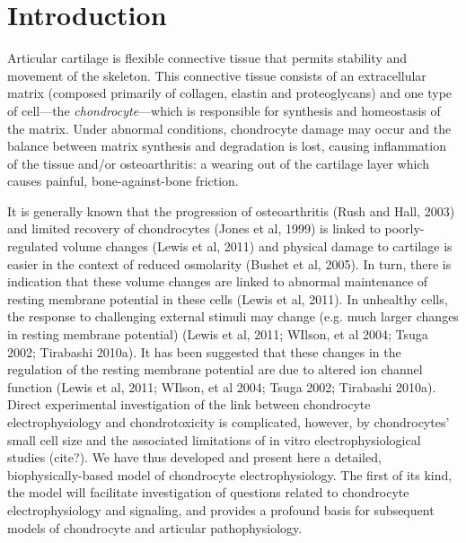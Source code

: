 \section{Introduction}
\label{introduction}

Articular cartilage is flexible connective tissue that permits stability and movement of the skeleton. 
This connective tissue consists of an extracellular matrix (composed primarily of collagen, elastin and proteoglycans) and one type of cell---the {\em chondrocyte}---which is responsible for synthesis and homeostasis of the matrix. 
Under abnormal conditions, chondrocyte damage may occur and the balance between matrix synthesis and degradation is lost, causing inflammation of the tissue and/or osteoarthritis: a wearing out of the cartilage layer which causes painful, bone-against-bone friction.

It is generally known that the progression of osteoarthritis (Rush and Hall, 2003) and limited recovery of chondrocytes (Jones et al, 1999) is linked to poorly-regulated volume changes (Lewis et al, 2011) and physical damage to cartilage is easier in the context of reduced osmolarity (Bushet et al, 2005).
In turn, there is indication that these volume changes are linked to abnormal maintenance of resting membrane potential in these cells (Lewis et al, 2011).
In unhealthy cells, the response to challenging external stimuli may change (e.g. much larger changes in resting membrane potential) (Lewis et al, 2011; WIlson, et al 2004; Tsuga 2002; Tirabashi 2010a).
It has been suggested that these changes in the regulation of the resting membrane potential are due to altered ion channel function (Lewis et al, 2011; WIlson, et al 2004; Tsuga 2002; Tirabashi 2010a).
Direct experimental investigation of the link between chondrocyte electrophysiology and chondrotoxicity is complicated, however, by chondrocytes' small cell size and the associated limitations of in vitro electrophysiological studies (cite?).
We have thus developed and present here a detailed, biophysically-based model of chondrocyte electrophysiology.
The first of its kind, the model will facilitate investigation of questions related to chondrocyte electrophysiology and signaling, and provides a profound basis for subsequent models of chondrocyte and articular pathophysiology.

